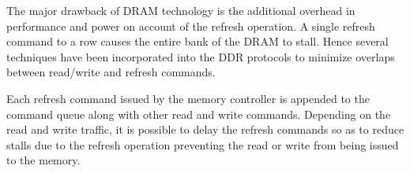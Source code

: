 The major drawback of DRAM technology is the additional overhead in performance and power on account of the refresh operation. A single refresh command to a row causes the entire bank of the DRAM to stall. Hence several techniques have been incorporated into the DDR protocols to minimize overlaps between read/write and refresh commands.

Each refresh command issued by the memory controller is appended to the command queue along with other read and write commands. Depending on the read and write traffic, it is possible to delay the refresh commands so as to reduce stalls due to the refresh operation preventing the read or write from being issued to the memory. 

